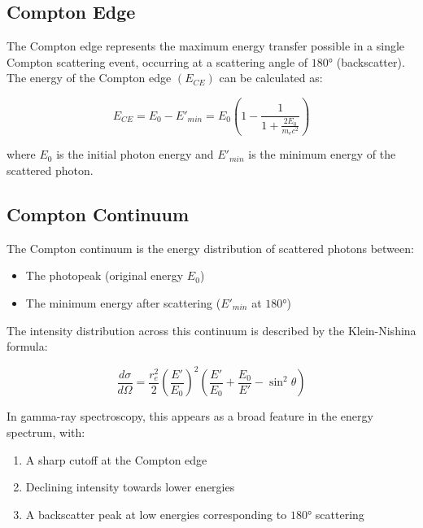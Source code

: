 \documentclass[
  a4paper,
]{book}
\providecommand{\tightlist}{%
  \setlength{\itemsep}{0pt}\setlength{\parskip}{0pt}}
\begin{document}
\begin{tcolorbox}[enhanced jigsaw, coltitle=black, title=\textcolor{quarto-callout-note-color}{\faInfo}\hspace{0.5em}{Compton Continuum and Compton Edge}, colframe=quarto-callout-note-color-frame, toprule=.15mm, opacitybacktitle=0.6, left=2mm, opacityback=0, breakable, toptitle=1mm, bottomtitle=1mm, leftrule=.75mm, arc=.35mm, titlerule=0mm, colbacktitle=quarto-callout-note-color!10!white, rightrule=.15mm, bottomrule=.15mm, colback=white]

\subsection{Compton Edge}\label{compton-edge}

The Compton edge represents the maximum energy transfer possible in a
single Compton scattering event, occurring at a scattering angle of
\(180°\) (backscatter). The energy of the Compton edge \((E_{CE})\) can
be calculated as:

\[E_{CE} = E_0 - E'_{min} = E_0\left(1 - \frac{1}{1 + \frac{2E_0}{m_ec^2}}\right)\]

where \(E_0\) is the initial photon energy and \(E'_{min}\) is the
minimum energy of the scattered photon.

\subsection{Compton Continuum}\label{compton-continuum}

The Compton continuum is the energy distribution of scattered photons
between:

\begin{itemize}
\tightlist
\item
  The photopeak (original energy \(E_0\))
\item
  The minimum energy after scattering (\(E'_{min}\) at \(180°\))
\end{itemize}

The intensity distribution across this continuum is described by the
Klein-Nishina formula:

\[\frac{d\sigma}{d\Omega} = \frac{r_e^2}{2}\left(\frac{E'}{E_0}\right)^2\left(\frac{E'}{E_0} + \frac{E_0}{E'} - \sin^2\theta\right)\]

In gamma-ray spectroscopy, this appears as a broad feature in the energy
spectrum, with:

\begin{enumerate}
\def\labelenumi{\arabic{enumi}.}
\tightlist
\item
  A sharp cutoff at the Compton edge
\item
  Declining intensity towards lower energies
\item
  A backscatter peak at low energies corresponding to \(180°\)
  scattering
\end{enumerate}

\end{tcolorbox}
\end{document}
